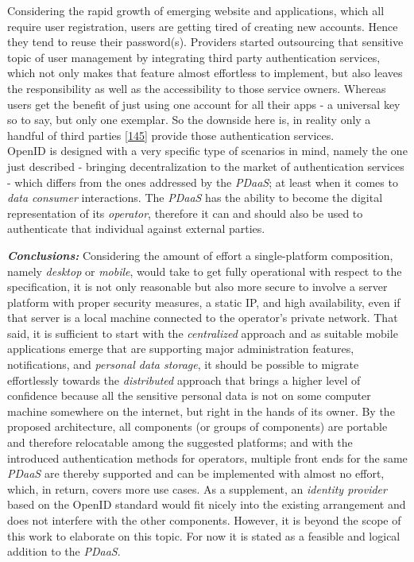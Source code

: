 \documentclass[12pt,english,a4paper,titlepage,cleardoublepage=empty,dottedtoc]{report}
\begin{document}
Considering the rapid growth of emerging website and applications, which
all require user registration, users are getting tired of creating new
accounts. Hence they tend to reuse their password(s). Providers started
outsourcing that sensitive topic of user management by integrating third
party authentication services, which not only makes that feature almost
effortless to implement, but also leaves the responsibility as well as
the accessibility to those service owners. Whereas users get the benefit
of just using one account for all their apps - a universal key so to
say, but only one exemplar. So the downside here is, in reality only a
handful of third parties
{[}\protect\hyperlink{ref-web_2009-success-of-facebook-connect}{145}{]}
provide those authentication services.\\
OpenID is designed with a very specific type of scenarios in mind,
namely the one just described - bringing decentralization to the market
of authentication services - which differs from the ones addressed by
the \emph{PDaaS}; at least when it comes to \emph{data consumer}
interactions. The \emph{PDaaS} has the ability to become the digital
representation of its \emph{operator}, therefore it can and should also
be used to authenticate that individual against external parties.

\emph{\textbf{Conclusions:}} Considering the amount of effort a
single-platform composition, namely \emph{desktop} or \emph{mobile},
would take to get fully operational with respect to the specification,
it is not only reasonable but also more secure to involve a server
platform with proper security measures, a static IP, and high
availability, even if that server is a local machine connected to the
operator's private network. That said, it is sufficient to start with
the \emph{centralized} approach and as suitable mobile applications
emerge that are supporting major administration features, notifications,
and \emph{personal data storage}, it should be possible to migrate
effortlessly towards the \emph{distributed} approach that brings a
higher level of confidence because all the sensitive personal data is
not on some computer machine somewhere on the internet, but right in the
hands of its owner. By the proposed architecture, all components (or
groups of components) are portable and therefore relocatable among the
suggested platforms; and with the introduced authentication methods for
operators, multiple front ends for the same \emph{PDaaS} are thereby
supported and can be implemented with almost no effort, which, in
return, covers more use cases. As a supplement, an \emph{identity
provider} based on the OpenID standard would fit nicely into the
existing arrangement and does not interfere with the other components.
However, it is beyond the scope of this work to elaborate on this topic.
For now it is stated as a feasible and logical addition to the
\emph{PDaaS}.
\end{document}
